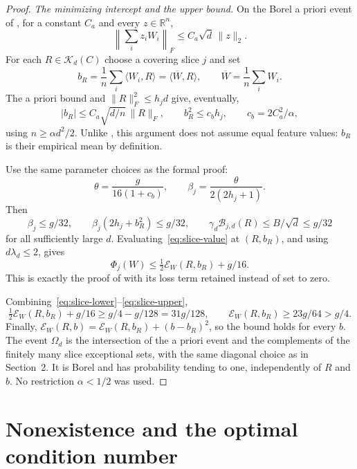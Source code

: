 \documentclass[11pt]{article}
\newcommand{\R}{\mathbb R}
\newcommand{\norm}[1]{\lVert#1\rVert}
\theoremstyle{remark}
\begin{document}
\begin{proof}
\emph{The minimizing intercept and the upper bound.}
On the Borel a priori event of , for a
constant $C_a$ and every $z\in\R^n$,
\[
 \left\|\sum_i z_iW_i\right\|_F\le C_a\sqrt d\,\norm z_2.
\]
For each $R\in\mathcal K_d(C)$ choose a covering slice $j$ and set
\[
 b_R=\frac1n\sum_i\langle W_i,R\rangle
       =\langle\overline W,R\rangle,\qquad
 \overline W=\frac1n\sum_i W_i.
\]
The a priori bound and $\norm R_F^2\le h_jd$ give, eventually,
\begin{equation}\label{eq:intercept-bound}
 |b_R|\le C_a\sqrt{d/n}\,\norm R_F,
 \qquad b_R^2\le c_bh_j,\qquad c_b=2C_a^2/\alpha,
\end{equation}
using $n\ge\alpha d^2/2$. Unlike , this argument
does not assume equal feature values: $b_R$ is their empirical mean by
definition.

Use the same parameter choices as the formal proof:
\[
 \theta=\frac{g}{16(1+c_b)},\qquad
 \beta_j=\frac{\theta}{2(2h_j+1)}.
\]
Then
\begin{equation}\label{eq:ridge-bounds}
 \beta_j\le g/32,\qquad
 \beta_j(2h_j+b_R^2)\le g/32,\qquad
 \gamma_d\mathcal B_{j,d}(R)\le B/\sqrt d\le g/32
\end{equation}
for all sufficiently large $d$. Evaluating~\eqref{eq:slice-value} at
$(R,b_R)$, and using $d\lambda_d\le2$, gives
\begin{equation}\label{eq:slice-upper}
 \Phi_j(W)\le\tfrac12\mathcal E_W(R,b_R)+g/16.
\end{equation}
This is exactly the proof of  with its loss term
retained instead of set to zero.

Combining~\eqref{eq:slice-lower}--\eqref{eq:slice-upper},
\[
 \tfrac12\mathcal E_W(R,b_R)+g/16
       \ge g/4-g/128=31g/128,
 \qquad \mathcal E_W(R,b_R)\ge23g/64>g/4.
\]
Finally,
$\mathcal E_W(R,b)=\mathcal E_W(R,b_R)+(b-b_R)^2$,
so the bound holds for every $b$. The event $\Omega_d$ is the
intersection of the a priori event and the complements of the finitely
many slice exceptional sets, with the same diagonal choice as in
Section~2. It is Borel and has probability tending to one, independently
of $R$ and $b$. No restriction $\alpha<1/2$ was used.
\end{proof}

\section{Nonexistence and the optimal condition number}
\end{document}
